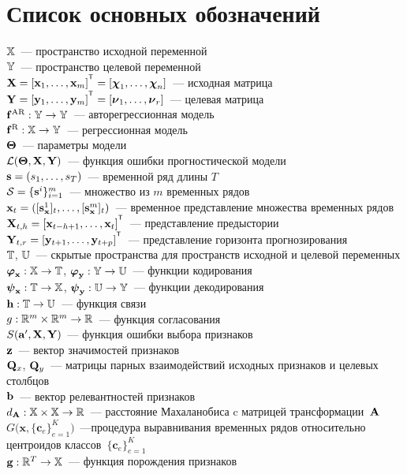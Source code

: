 \chapter*{Список основных обозначений}
\noindent 
$\mathbb{X}$~--- пространство исходной переменной \\
$\mathbb{Y}$~--- пространство целевой переменной \\
$\bX = [\bx_1, \dots, \bx_m]^{\T} =  [\bchi_1, \dots, \bchi_n]$~--- исходная матрица \\
$\bY = [\by_1, \dots, \by_m]^{\T} =  [\bnu_1, \dots, \bnu_r]$~--- целевая матрица  \\
$\mathbf{f}^{\text{AR}}: \mathbb{Y} \rightarrow \mathbb{Y}$~--- авторегрессионная модель \\
$\mathbf{f}^{\text{R}}: \mathbb{X} \rightarrow \mathbb{Y}$~--- регрессионная модель \\
$\boldsymbol{\Theta}$~--- параметры модели \\
$\mathcal{L}(\boldsymbol{\Theta}, \mathbf{X}, \mathbf{Y})$~--- функция ошибки прогностической модели \\
$\mathbf{s} = (s_1, \dots, s_T)$~--- временной ряд длины $T$ \\
$\mathcal{S} = \{\mathbf{s}^i\}_{i=1}^m$~--- множество из $m$ временных рядов \\
$\mathbf{x}_t = ([\mathbf{s}_{\mathbf{x}}^1]_t, \dots, [\mathbf{s}_{\mathbf{x}}^m]_t)$~--- временное представление множества временных рядов \\
$\bX_{t,h} = [\bx_{t - h + 1}, \dots, \bx_{t}]^{\T}$~--- представление предыстории \\
$\bY_{t,r} = [\by_{t + 1}, \dots, \by_{t + p}]^{\T}$~--- представление горизонта прогнозирования \\
$\mathbb{T}$, $\mathbb{U}$~--- скрытые пространства для пространств исходной и целевой переменных \\
$\boldsymbol{\varphi}_{\mathbf{x}}: \mathbb{X} \rightarrow \mathbb{T}$, $\boldsymbol{\varphi}_{\mathbf{y}}: \mathbb{Y} \rightarrow \mathbb{U}$~--- функции кодирования \\
$\boldsymbol{\psi}_{\mathbf{x}}: \mathbb{T} \rightarrow \mathbb{X}$, $\boldsymbol{\psi}_{\mathbf{y}}: \mathbb{U} \rightarrow \mathbb{Y}$~--- функции декодирования \\
$\mathbf{h}: \mathbb{T}\rightarrow \mathbb{U}$~--- функция связи \\
$g: \mathbb{R}^m \times \mathbb{R}^m \rightarrow \mathbb{R}$~--- функция согласования \\
$S(\mathbf{a}', \mathbf{X}, \mathbf{Y})$~--- функция ошибки выбора признаков \\
$\mathbf{z}$~--- вектор значимостей признаков \\
$\mathbf{Q}_x$, $\mathbf{Q}_y$~--- матрицы парных взаимодействий исходных признаков и целевых столбцов \\
$\mathbf{b}$~--- вектор релевантностей признаков \\
$d_{\mathbf{A}}: \mathbb{X} \times \mathbb{X} \rightarrow \mathbb{R}$~--- расстояние Махаланобиса c матрицей	трансформации~$\mathbf{A}$ \\
$G\bigl(\mathbf{x}, \{\mathbf{c}_e\}_{e = 1} ^ K\bigr)$~---процедура выравнивания временных рядов относительно центроидов классов~$\{\mathbf{c}_e\}_{e = 1} ^ K$ \\
$\mathbf{g}: \mathbb{R}^T \rightarrow \mathbb{X}$~--- функция порождения признаков